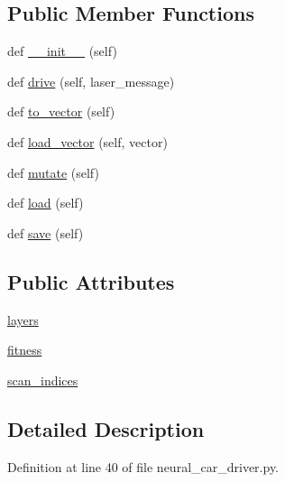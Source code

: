 \subsection*{Public Member Functions}
\begin{DoxyCompactItemize}
\item 
def \hyperlink{classneural__car__driver_1_1_neural_car_driver_ab0cc2f18e4345f9814fa137028336d1a}{\+\_\+\+\_\+init\+\_\+\+\_\+} (self)
\item 
def \hyperlink{classneural__car__driver_1_1_neural_car_driver_ab46c72e7432f683a99788c8efc3c9741}{drive} (self, laser\+\_\+message)
\item 
def \hyperlink{classneural__car__driver_1_1_neural_car_driver_aa9ca18514eaf2ebe42c9c88f6c99ccac}{to\+\_\+vector} (self)
\item 
def \hyperlink{classneural__car__driver_1_1_neural_car_driver_a4c42a4dff190065b381d5de451accf9f}{load\+\_\+vector} (self, vector)
\item 
def \hyperlink{classneural__car__driver_1_1_neural_car_driver_a1c57aa3cbee31e70a7eacb9c542d5848}{mutate} (self)
\item 
def \hyperlink{classneural__car__driver_1_1_neural_car_driver_a3ac13655a442d6106272aef2b3d3e468}{load} (self)
\item 
def \hyperlink{classneural__car__driver_1_1_neural_car_driver_a9c9664d22b7e0f75f9908de73f7cf301}{save} (self)
\end{DoxyCompactItemize}
\subsection*{Public Attributes}
\begin{DoxyCompactItemize}
\item 
\hyperlink{classneural__car__driver_1_1_neural_car_driver_a425f558140c554a734fad61b9eb83940}{layers}
\item 
\hyperlink{classneural__car__driver_1_1_neural_car_driver_a4d709e4419449add88e2a1a5d825e918}{fitness}
\item 
\hyperlink{classneural__car__driver_1_1_neural_car_driver_ac7a4e813a3f642cdb4c88a3c7bcc0ac7}{scan\+\_\+indices}
\end{DoxyCompactItemize}


\subsection{Detailed Description}


Definition at line 40 of file neural\+\_\+car\+\_\+driver.\+py.



